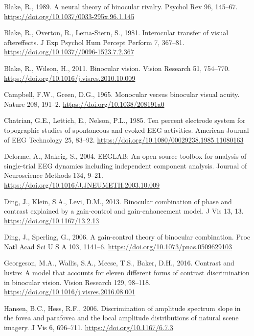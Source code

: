 \documentclass[
  12pt,
]{article}
\newlength{\cslhangindent}
\newenvironment{CSLReferences}[2] %
 {\begin{list}{}{%
  \setlength{\itemindent}{0pt}
  \setlength{\leftmargin}{0pt}
  \setlength{\parsep}{0pt}
  \ifodd #1
   \setlength{\leftmargin}{\cslhangindent}
   \setlength{\itemindent}{-1\cslhangindent}
  \fi
  \setlength{\itemsep}{#2\baselineskip}}}
 {\end{list}}
\begin{document}
\begin{CSLReferences}{1}{0}
Blake, R., 1989. A neural theory of binocular rivalry. Psychol Rev 96,
145--67. \url{https://doi.org/10.1037/0033-295x.96.1.145}

Blake, R., Overton, R., Lema-Stern, S., 1981. Interocular transfer of
visual aftereffects. J Exp Psychol Hum Percept Perform 7, 367--81.
\url{https://doi.org/10.1037//0096-1523.7.2.367}

Blake, R., Wilson, H., 2011. Binocular vision. Vision Research 51,
754--770. \url{https://doi.org/10.1016/j.visres.2010.10.009}

Campbell, F.W., Green, D.G., 1965. Monocular versus binocular visual
acuity. Nature 208, 191--2. \url{https://doi.org/10.1038/208191a0}

Chatrian, G.E., Lettich, E., Nelson, P.L., 1985. Ten percent electrode
system for topographic studies of spontaneous and evoked EEG activities.
American Journal of EEG Technology 25, 83--92.
\url{https://doi.org/10.1080/00029238.1985.11080163}

Delorme, A., Makeig, S., 2004. EEGLAB: An open source toolbox for
analysis of single-trial EEG dynamics including independent component
analysis. Journal of Neuroscience Methods 134, 9--21.
\url{https://doi.org/10.1016/J.JNEUMETH.2003.10.009}

Ding, J., Klein, S.A., Levi, D.M., 2013. Binocular combination of phase
and contrast explained by a gain-control and gain-enhancement model. J
Vis 13, 13. \url{https://doi.org/10.1167/13.2.13}

Ding, J., Sperling, G., 2006. A gain-control theory of binocular
combination. Proc Natl Acad Sci U S A 103, 1141--6.
\url{https://doi.org/10.1073/pnas.0509629103}

Georgeson, M.A., Wallis, S.A., Meese, T.S., Baker, D.H., 2016. Contrast
and lustre: A model that accounts for eleven different forms of contrast
discrimination in binocular vision. Vision Research 129, 98--118.
\url{https://doi.org/10.1016/j.visres.2016.08.001}

Hansen, B.C., Hess, R.F., 2006. Discrimination of amplitude spectrum
slope in the fovea and parafovea and the local amplitude distributions
of natural scene imagery. J Vis 6, 696--711.
\url{https://doi.org/10.1167/6.7.3}


\end{CSLReferences}
\end{document}
